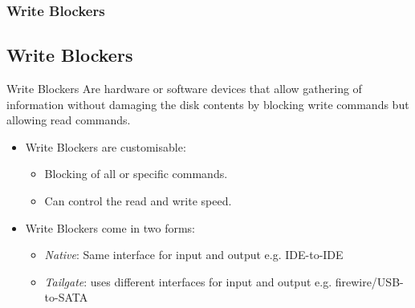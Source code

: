 \documentclass{beamer}
\begin{document}
\begin{frame}
	\frametitle{Write Blockers}
	\subsection{Write Blockers}
	\begin{block}{Write Blockers}
			Are hardware or software devices that allow gathering of information without damaging the disk contents by blocking write commands but allowing read commands.
	\end{block}
	\begin{itemize}
		\item Write Blockers are customisable:
			\begin{itemize}
				\item Blocking of all or specific commands.
				\item Can control the read and write speed.
			\end{itemize}
		\item Write Blockers come in two forms:
			\begin{itemize}
				\item \emph{Native}: Same interface for input and output e.g. IDE-to-IDE
				\item \emph{Tailgate}: uses different interfaces for input and output e.g. firewire/USB-to-SATA
			\end{itemize}
		\end{itemize}
\end{frame}
\end{document}
